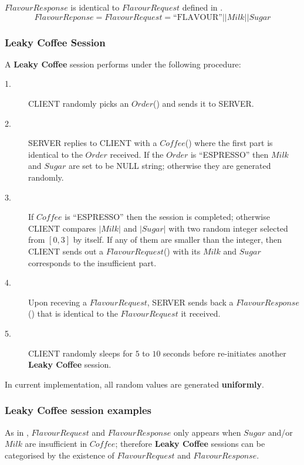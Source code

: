 \begin{definition} \label{Def: FlavourResponse}
$FlavourResponse$ is identical to $FlavourRequest$ defined in .
\begin{equation*}
FlavourReponse = FlavourRequest =  \text{“FLAVOUR”} || Milk || Sugar
\end{equation*}
\end{definition}

\begin{definition} \label{Def: Leaky Coffee Session}
\subsubsection{Leaky Coffee Session}
A \textbf{Leaky Coffee} session performs under the following procedure:

\begin{description}
\item[1.] CLIENT randomly picks an $Order$() and sends it to SERVER.

\item[2.] SERVER replies to CLIENT with a $Coffee$() where the first part is identical to the $Order$ received. If the $Order$ is “ESPRESSO” then $Milk$ and $Sugar$ are set to be NULL string; otherwise they are generated randomly.

\item[3.] If $Coffee$ is “ESPRESSO” then the session is completed; otherwise CLIENT compares $|Milk|$ and $|Sugar|$ with two random integer selected from $[0,3]$ by itself. If any of them are smaller than the integer, then CLIENT sends out a $FlavourRequest$() with its $Milk$ and $Sugar$ corresponds to the insufficient part.

\item[4.] Upon receving a $FlavourRequest$, SERVER sends back a $FlavourResponse$() that is identical to the $FlavourRequest$ it received.

\item[5.] CLIENT randomly sleeps for $5$ to $10$ seconds before re-initiates another \textbf{Leaky Coffee} session.
\end{description}
In current implementation, all random values are generated \textbf{uniformly}.
\end{definition}

\subsubsection{Leaky Coffee session examples}
As in , $FlavourRequest$ and $FlavourResponse$ only appears when $Sugar$ and/or $Milk$ are insufficient in $Coffee$; therefore \textbf{Leaky Coffee} sessions can be categorised by the existence of $FlavourRequest$ and $FlavourResponse$.

